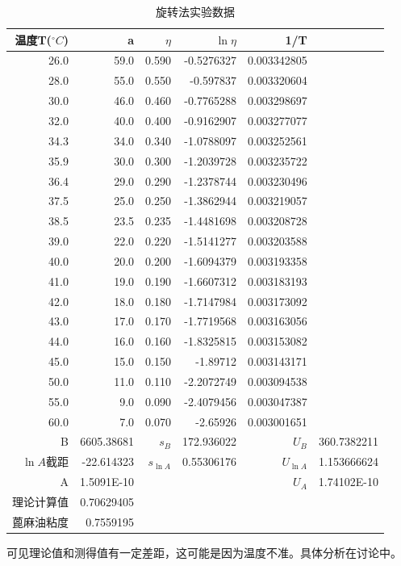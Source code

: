\documentclass[12pt,a4paper]{ctexart}
\begin{document}
\begin{table}[htbp]
  \centering
  \caption{旋转法实验数据}
    \begin{tabular}{rrrrrr}
    \toprule
    温度T($^{\circ}C$) & a     & $\eta$ & $\ln{\eta}$ & 1/T   &  \\
    \midrule
    26.0  & 59.0  & 0.590 & -0.5276327 & 0.003342805 &  \\
    28.0  & 55.0  & 0.550 & -0.597837 & 0.003320604 &  \\
    30.0  & 46.0  & 0.460 & -0.7765288 & 0.003298697 &  \\
    32.0  & 40.0  & 0.400 & -0.9162907 & 0.003277077 &  \\
    34.3  & 34.0  & 0.340 & -1.0788097 & 0.003252561 &  \\
    35.9  & 30.0  & 0.300 & -1.2039728 & 0.003235722 &  \\
    36.4  & 29.0  & 0.290 & -1.2378744 & 0.003230496 &  \\
    37.5  & 25.0  & 0.250 & -1.3862944 & 0.003219057 &  \\
    38.5  & 23.5  & 0.235 & -1.4481698 & 0.003208728 &  \\
    39.0  & 22.0  & 0.220 & -1.5141277 & 0.003203588 &  \\
    40.0  & 20.0  & 0.200 & -1.6094379 & 0.003193358 &  \\
    41.0  & 19.0  & 0.190 & -1.6607312 & 0.003183193 &  \\
    42.0  & 18.0  & 0.180 & -1.7147984 & 0.003173092 &  \\
    43.0  & 17.0  & 0.170 & -1.7719568 & 0.003163056 &  \\
    44.0  & 16.0  & 0.160 & -1.8325815 & 0.003153082 &  \\
    45.0  & 15.0  & 0.150 & -1.89712 & 0.003143171 &  \\
    50.0  & 11.0  & 0.110 & -2.2072749 & 0.003094538 &  \\
    55.0  & 9.0   & 0.090 & -2.4079456 & 0.003047387 &  \\
    60.0  & 7.0   & 0.070 & -2.65926 & 0.003001651 &  \\
    B     & 6605.38681 & $s_B$ & 172.936022 & $U_B$ & 360.7382211 \\
    $\ln{A}$截距 & -22.614323 & $s_{\ln A}$ & 0.55306176 & $U_{\ln A}$ & 1.153666624 \\
    A     & 1.5091E-10 &       &       & $U_A$ & 1.74102E-10 \\
    理论计算值   & 0.70629405 &       &       &       &  \\
    蓖麻油粘度 & 0.7559195 &       &       &       &  \\
    \bottomrule
    \end{tabular}%
  \label{tab:addlabel}%
\end{table}%
可见理论值和测得值有一定差距，这可能是因为温度不准。具体分析在讨论中。
\end{document}
